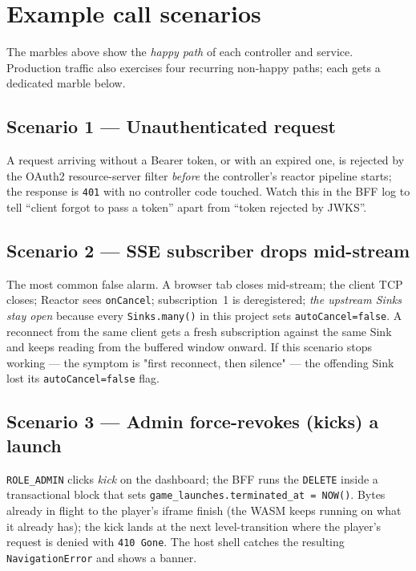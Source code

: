 \section{Example call scenarios}

The marbles above show the \emph{happy path} of each controller and
service. Production traffic also exercises four recurring non-happy
paths; each gets a dedicated marble below.

\subsection*{Scenario 1 --- Unauthenticated request}


A request arriving without a Bearer token, or with an expired one,
is rejected by the OAuth2 resource-server filter \emph{before} the
controller's reactor pipeline starts; the response is \texttt{401}
with no controller code touched. Watch this in the BFF log to tell
``client forgot to pass a token'' apart from ``token rejected by
JWKS''.

\subsection*{Scenario 2 --- SSE subscriber drops mid-stream}


The most common false alarm. A browser tab closes mid-stream; the
client TCP closes; Reactor sees \texttt{onCancel}; subscription~1 is
deregistered; \emph{the upstream Sinks stay open} because every
\texttt{Sinks.many()} in this project sets \texttt{autoCancel=false}.
A reconnect from the same client gets a fresh subscription against
the same Sink and keeps reading from the buffered window onward. If
this scenario stops working --- the symptom is "first reconnect, then
silence" --- the offending Sink lost its \texttt{autoCancel=false}
flag.

\subsection*{Scenario 3 --- Admin force-revokes (kicks) a launch}


\texttt{ROLE\_ADMIN} clicks \emph{kick} on the dashboard; the BFF runs
the \texttt{DELETE} inside a transactional block that sets
\texttt{game\_launches.terminated\_at = NOW()}. Bytes already in
flight to the player's iframe finish (the WASM keeps running on what
it already has); the kick lands at the next level-transition where
the player's request is denied with \texttt{410 Gone}. The host shell
catches the resulting \texttt{NavigationError} and shows a banner.

